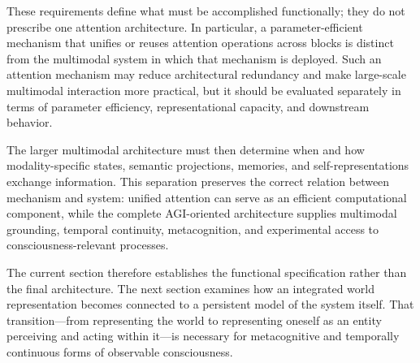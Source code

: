 These requirements define what must be accomplished functionally; they do not prescribe one attention architecture. In particular, a parameter-efficient mechanism that unifies or reuses attention operations across blocks is distinct from the multimodal system in which that mechanism is deployed. Such an attention mechanism may reduce architectural redundancy and make large-scale multimodal interaction more practical, but it should be evaluated separately in terms of parameter efficiency, representational capacity, and downstream behavior.

The larger multimodal architecture must then determine when and how modality-specific states, semantic projections, memories, and self-representations exchange information. This separation preserves the correct relation between mechanism and system: unified attention can serve as an efficient computational component, while the complete AGI-oriented architecture supplies multimodal grounding, temporal continuity, metacognition, and experimental access to consciousness-relevant processes.

The current section therefore establishes the functional specification rather than the final architecture. The next section examines how an integrated world representation becomes connected to a persistent model of the system itself. That transition---from representing the world to representing oneself as an entity perceiving and acting within it---is necessary for metacognitive and temporally continuous forms of observable consciousness.
